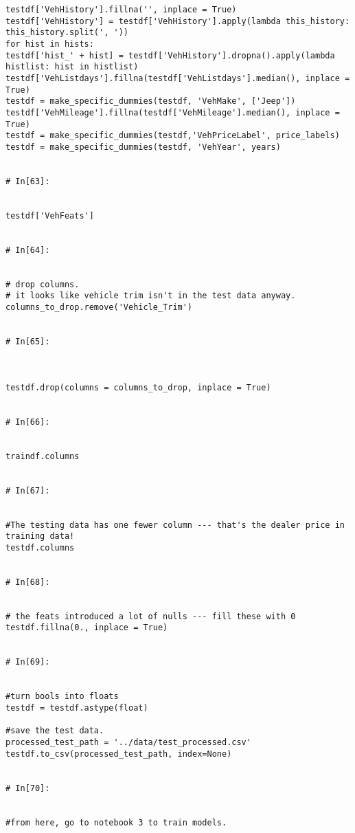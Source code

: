\begin{verbatim}
testdf['VehHistory'].fillna('', inplace = True)
testdf['VehHistory'] = testdf['VehHistory'].apply(lambda this_history: this_history.split(', '))
for hist in hists:
testdf['hist_' + hist] = testdf['VehHistory'].dropna().apply(lambda histlist: hist in histlist)
testdf['VehListdays'].fillna(testdf['VehListdays'].median(), inplace = True)
testdf = make_specific_dummies(testdf, 'VehMake', ['Jeep'])
testdf['VehMileage'].fillna(testdf['VehMileage'].median(), inplace = True)
testdf = make_specific_dummies(testdf,'VehPriceLabel', price_labels)
testdf = make_specific_dummies(testdf, 'VehYear', years)


# In[63]:


testdf['VehFeats']


# In[64]:


# drop columns.
# it looks like vehicle trim isn't in the test data anyway.
columns_to_drop.remove('Vehicle_Trim')


# In[65]:



testdf.drop(columns = columns_to_drop, inplace = True)


# In[66]:


traindf.columns


# In[67]:


#The testing data has one fewer column --- that's the dealer price in training data!
testdf.columns


# In[68]:


# the feats introduced a lot of nulls --- fill these with 0
testdf.fillna(0., inplace = True)


# In[69]:


#turn bools into floats
testdf = testdf.astype(float)

#save the test data.
processed_test_path = '../data/test_processed.csv'
testdf.to_csv(processed_test_path, index=None)


# In[70]:


#from here, go to notebook 3 to train models.


\end{verbatim}